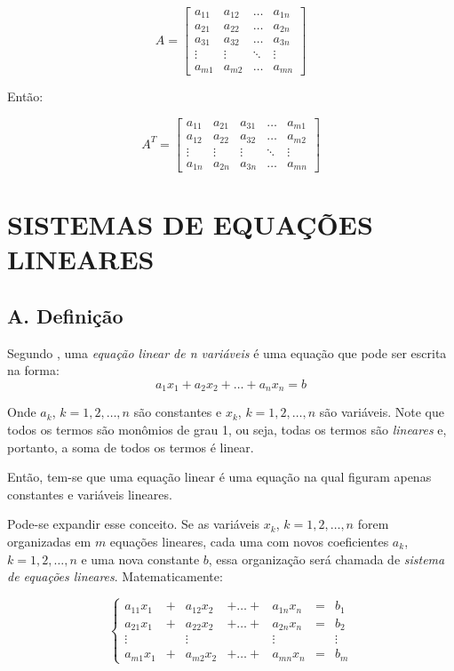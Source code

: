 \documentclass[twocolumn, 10pt,a4paper]{extarticle}
\begin{document}
\[ 
A = 
\begin{bmatrix}
a_{11} & a_{12} & \dots & a_{1n} \\
a_{21} & a_{22} & \dots & a_{2n} \\
a_{31} & a_{32} & \dots & a_{3n} \\
\vdots & \vdots & \ddots & \vdots \\
a_{m1} & a_{m2} & \dots & a_{mn}  


\end{bmatrix}
\]

Então:

\[ 
A^T = 
\begin{bmatrix}
a_{11} & a_{21} & a_{31} & \dots & a_{m1} \\
a_{12} & a_{22} & a_{32} & \dots & a_{m2} \\
\vdots & \vdots & \vdots & \ddots & \vdots \\
a_{1n} & a_{2n} & a_{3n} & \dots & a_{mn} 

\end{bmatrix}
\]

\section{SISTEMAS DE EQUAÇÕES LINEARES}

\subsection*{A. \quad Definição}
Segundo \cite[p. 2]{antonAlgebra}, uma \textit{equação linear de n variáveis} é uma equação que pode ser escrita na forma:
\[
	a_1x_1 + a_2x_2 + \dots + a_nx_n = b
\]

Onde $a_k$, $k = 1, 2, \dots, n$ são constantes e $x_k$, $k = 1, 2, \dots, n$ são variáveis. Note que todos os termos são monômios de grau 1, ou seja, todas os termos são \textit{lineares} e, portanto, a soma de todos os termos é linear. 

Então, tem-se que uma equação linear é uma equação na qual figuram apenas constantes e variáveis lineares.

Pode-se expandir esse conceito. Se as variáveis $x_k$, $k = 1, 2, \dots, n$ forem organizadas em $m$ equações lineares, cada uma com novos coeficientes $a_k$, $k = 1, 2, \dots, n$ e uma nova constante $b$, essa organização será chamada de \textit{sistema de equações lineares}. Matematicamente:

\[
\left\{
\begin{aligned}
   a_{11}x_1 & + &  a_{12}x_2 & + \dots + & a_{1n}x_n &= & b_1 \\
   a_{21}x_1 & + &  a_{22}x_2 & + \dots + & a_{2n}x_n &= & b_2 \\
   \vdots &   & \vdots &  &  \vdots  & & \vdots \\
   a_{m1}x_1 & + &  a_{m2}x_2 & + \dots + & a_{mn}x_n &= & b_m 
\end{aligned}
\right.
\]
\end{document}
